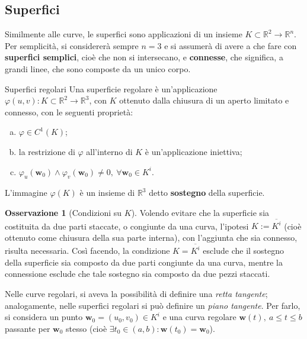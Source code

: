 \documentclass[11pt, a4paper]{scrartcl}
\theoremstyle{definition}
\numberwithin{esempio}{section}
\theoremstyle{definition}
\newtheorem{obs}{Osservazione}
\numberwithin{obs}{section}
\numberwithin{nota}{section}
\numberwithin{equation}{subsection}
\begin{document}
\subsection{Superfici}
Similmente alle curve, le superfici sono applicazioni di un insieme $K \subset \mathbb{R}^2 \to \mathbb{R}^n$. 
Per semplicit\`a, si considerer\`a sempre $n=3$ e si assumer\`a di avere a che fare con \textbf{superfici semplici}, cio\`e che non si intersecano, e \textbf{connesse}, che significa, a grandi linee, che sono composte da un unico corpo.
\begin{definizione}
	{Superfici regolari}{}
Una superficie regolare \`e un'applicazione $\varphi (u,v):K \subset \mathbb{R}^2 \to \mathbb{R}^3$, con $K$ ottenuto dalla chiusura di un aperto limitato e connesso, con le seguenti propriet\`a:
\begin{enumerate}[(a).]
	\item $\varphi \in C^1(K)$;
	\item la restrizione di $\varphi $ all'interno di $K$ \`e un'applicazione iniettiva;
	\item $\varphi _u (\mathbf{w}_0) \wedge \varphi _v(\mathbf{w} _0) \neq  0 , \ \forall \mathbf{w} _0 \in K^i$.
\end{enumerate}
L'immagine $\varphi (K)$ \`e un insieme di $\mathbb{R}^3$ detto \textbf{sostegno} della superficie.
\end{definizione}
\begin{obs}
	[Condizioni su $K$]
Volendo evitare che la superficie sia costituita da due parti staccate, o congiunte da una curva, l'ipotesi $K:= \overline{K^i}$ (cio\`e ottenuto come chiusura della sua parte interna), con l'aggiunta che sia connesso, risulta necessaria. 
Cos\`i facendo, la condizione $K = \overline{K^i}$ esclude che il sostegno della superficie sia composto da due parti congiunte da una curva, mentre la connessione esclude che tale sostegno sia composto da due pezzi staccati.
\end{obs}
Nelle curve regolari, si aveva la possibilit\`a di definire una \textit{retta tangente}; analogamente, nelle superfici regolari si pu\`o definire un \textit{piano tangente}.
Per farlo, si considera un punto $\mathbf{w} _0 = (u_0,v_0) \in K^i$ e una curva regolare $\mathbf{w} (t), \ a \le t\le b$ passante per $\mathbf{w} _0 $ stesso (cio\`e $\exists t_0 \in (a,b) : \mathbf{w} (t_0) = \mathbf{w} _0$).
\end{document}
